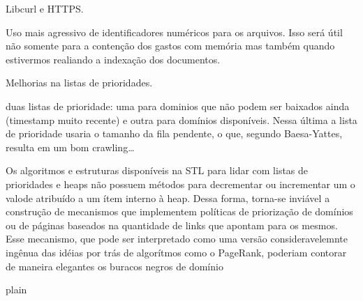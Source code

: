 \documentclass[10pt,twocolumn]{article}
\begin{document}
Libcurl e HTTPS.

Uso mais agressivo de identificadores numéricos para os arquivos. Isso será
útil não somente para a contenção dos gastos com memória mas também quando
estivermos realiando a indexação dos documentos.

Melhorias na listas de prioridades.

duas listas de prioridade: uma para dominios que não podem ser baixados
ainda (timestamp muito recente) e outra para domínios disponíveis. Nessa
última a lista de prioridade usaria o tamanho da fila pendente, o que,
segundo Baesa-Yattes, resulta em um bom crawling\ldots

 Os algoritmos e estruturas disponíveis na
STL para lidar com listas de prioridades e heaps não possuem métodos para
decrementar ou incrementar um o valode atribuído a um ítem interno à heap.
Dessa forma, torna-se inviável a construção de mecanismos que implementem
políticas de priorização de domínios ou de páginas baseados na quantidade de
links que apontam para os mesmos. Esse mecanismo, que pode ser interpretado
como uma versão consideravelemnte ingênua das idéias por trás de algorítmos
como o PageRank, poderiam contorar de maneira elegantes os buracos negros de
domínio



 {plain}

\end{document}
